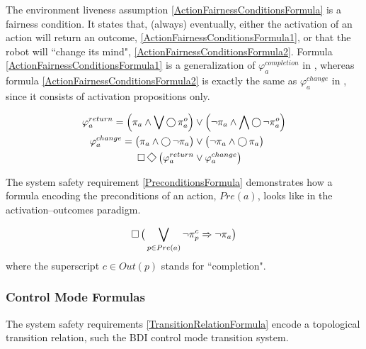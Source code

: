 The environment liveness assumption \eqref{ActionFairnessConditionsFormula} is a fairness condition.
It states that, (always) eventually, either the activation of an action will return an outcome, \eqref{ActionFairnessConditionsFormula1}, or that the robot will ``change its mind", \eqref{ActionFairnessConditionsFormula2}.
Formula \eqref{ActionFairnessConditionsFormula1} is a generalization of $\varphi_a^{completion}$ in \cite{Vasu2013ICRA}, whereas formula \eqref{ActionFairnessConditionsFormula2} is exactly the same as $\varphi_a^{change}$ in \cite{Vasu2013ICRA}, since it consists of activation propositions only.

\begin{subequations}
	\begin{align}
		\varphi_a^{return} = \Big( \pi_a \wedge \bigvee \LTLX \pi_a^o \Big) &\vee \Big( \lnot \pi_a \wedge \bigwedge \LTLX \lnot \pi_a^o \Big)\label{ActionFairnessConditionsFormula1}\\
		\varphi_a^{change} = \big( \pi_a \wedge \LTLX \lnot \pi_a \big) &\vee \big( \lnot \pi_a \wedge \LTLX \pi_a \big)\label{ActionFairnessConditionsFormula2}\\
		\LTLG \LTLF \big( \varphi_a^{return} &\vee \varphi_a^{change} \big)\label{ActionFairnessConditionsFormula}
	\end{align}
\end{subequations}

The system safety requirement \eqref{PreconditionsFormula} demonstrates how a formula encoding the preconditions of an action, $Pre(a)$, looks like in the activation--outcomes paradigm.

\begin{equation}\label{PreconditionsFormula}
	\operatorname{\Box} \big( \bigvee \limits_{p \in Pre(a)} \lnot \pi_p^c \Rightarrow \lnot \pi_a \big)
\end{equation}
where the superscript $c \in Out(p)$ stands for ``completion".


\subsubsection{Control Mode Formulas}

The system safety requirements \eqref{TransitionRelationFormula} encode a topological transition relation, such the BDI control mode transition system.


